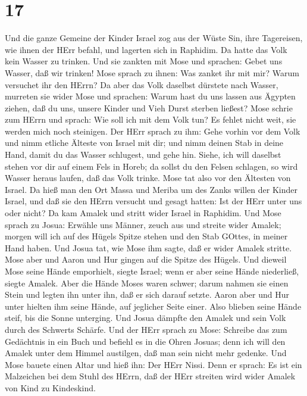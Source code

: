 \hypertarget{section-16}{%
\section{17}\label{section-16}}

 Und die ganze Gemeine der Kinder Israel zog aus der Wüste
Sin, ihre Tagereisen, wie ihnen der HErr befahl, und lagerten sich in
Raphidim. Da hatte das Volk kein Wasser zu trinken.  Und sie
zankten mit Mose und sprachen: Gebet uns Wasser, daß wir trinken! Mose
sprach zu ihnen: Was zanket ihr mit mir? Warum versuchet ihr den HErrn?
 Da aber das Volk daselbst dürstete nach Wasser, murreten
sie wider Mose und sprachen: Warum hast du uns lassen aus Ägypten
ziehen, daß du uns, unsere Kinder und Vieh Durst sterben ließest?
 Mose schrie zum HErrn und sprach: Wie soll ich mit dem Volk
tun? Es fehlet nicht weit, sie werden mich noch steinigen. 
Der HErr sprach zu ihm: Gehe vorhin vor dem Volk und nimm etliche
Älteste von Israel mit dir; und nimm deinen Stab in deine Hand, damit du
das Wasser schlugest, und gehe hin.  Siehe, ich will
daselbst stehen vor dir auf einem Fels in Horeb; da sollst du den Felsen
schlagen, so wird Wasser heraus laufen, daß das Volk trinke. Mose tat
also vor den Ältesten von Israel.  Da hieß man den Ort Massa
und Meriba um des Zanks willen der Kinder Israel, und daß sie den HErrn
versucht und gesagt hatten: Ist der HErr unter uns oder nicht?
 Da kam Amalek und stritt wider Israel in Raphidim.
 Und Mose sprach zu Josua: Erwähle uns Männer, zeuch aus und
streite wider Amalek; morgen will ich auf des Hügels Spitze stehen und
den Stab GOttes, in meiner Hand haben.  Und Josua tat, wie
Mose ihm sagte, daß er wider Amalek stritte. Mose aber und Aaron und Hur
gingen auf die Spitze des Hügels.  Und dieweil Mose seine
Hände emporhielt, siegte Israel; wenn er aber seine Hände niederließ,
siegte Amalek.  Aber die Hände Moses waren schwer; darum
nahmen sie einen Stein und legten ihn unter ihn, daß er sich darauf
setzte. Aaron aber und Hur unter hielten ihm seine Hände, auf jeglicher
Seite einer. Also blieben seine Hände steif, bis die Sonne unterging.
 Und Josua dämpfte den Amalek und sein Volk durch des
Schwerts Schärfe.  Und der HErr sprach zu Mose: Schreibe
das zum Gedächtnis in ein Buch und befiehl es in die Ohren Josuas; denn
ich will den Amalek unter dem Himmel austilgen, daß man sein nicht mehr
gedenke.  Und Mose bauete einen Altar und hieß ihn: Der
HErr Nissi.  Denn er sprach: Es ist ein Malzeichen bei dem
Stuhl des HErrn, daß der HErr streiten wird wider Amalek von Kind zu
Kindeskind.

